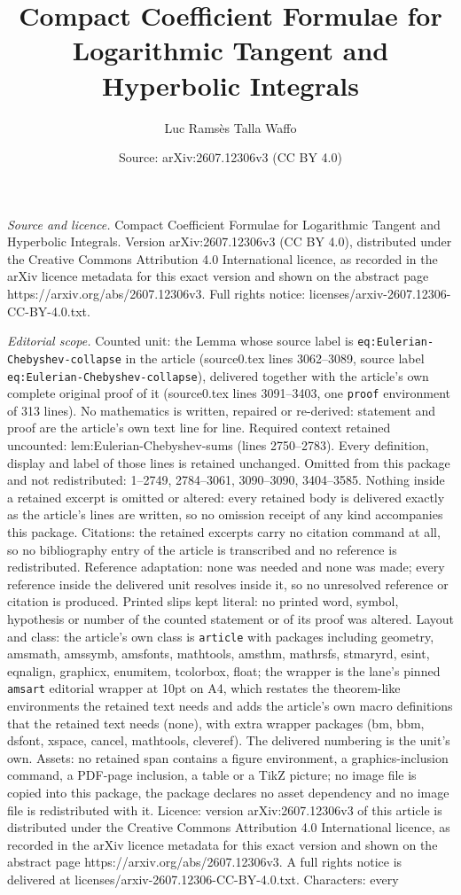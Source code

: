 \documentclass[10pt,a4paper]{amsart}
\title[Compact Coefficient Formulae for Logarithmic Tangent and Hyp]{Compact Coefficient Formulae for Logarithmic Tangent and Hyperbolic Integrals}
\author{Luc Rams\`es Talla Waffo}
\date{Source: arXiv:2607.12306v3 (CC BY 4.0)}
\begin{document}
\maketitle

\noindent\emph{Source and licence.} Compact Coefficient Formulae for Logarithmic Tangent and Hyperbolic Integrals. Version arXiv:2607.12306v3 (CC BY 4.0), distributed under the Creative Commons Attribution 4.0 International licence, as recorded in the arXiv licence metadata for this exact version and shown on the abstract page https://arxiv.org/abs/2607.12306v3. Full rights notice: licenses/arxiv-2607.12306-CC-BY-4.0.txt.\par\smallskip

\noindent\textit{Editorial scope.} Counted unit: the Lemma whose source label is \texttt{eq:Eulerian-Chebyshev-collapse} in the article (source0.tex lines 3062--3089, source label \texttt{eq:Eulerian-Chebyshev-collapse}), delivered together with the article's own complete original proof of it (source0.tex lines 3091--3403, one \texttt{proof} environment of 313 lines). No mathematics is written, repaired or re-derived: statement and proof are the article's own text line for line. Required context retained uncounted: lem:Eulerian-Chebyshev-sums (lines 2750--2783). Every definition, display and label of those lines is retained unchanged. Omitted from this package and not redistributed: 1--2749, 2784--3061, 3090--3090, 3404--3585. Nothing inside a retained excerpt is omitted or altered: every retained body is delivered exactly as the article's lines are written, so no omission receipt of any kind accompanies this package. Citations: the retained excerpts carry no citation command at all, so no bibliography entry of the article is transcribed and no reference is redistributed. Reference adaptation: none was needed and none was made; every reference inside the delivered unit resolves inside it, so no unresolved reference or citation is produced. Printed slips kept literal: no printed word, symbol, hypothesis or number of the counted statement or of its proof was altered. Layout and class: the article's own class is \texttt{article} with packages including geometry, amsmath, amssymb, amsfonts, mathtools, amsthm, mathrsfs, stmaryrd, esint, eqnalign, graphicx, enumitem, tcolorbox, float; the wrapper is the lane's pinned \texttt{amsart} editorial wrapper at 10pt on A4, which restates the theorem-like environments the retained text needs and adds the article's own macro definitions that the retained text needs (none), with extra wrapper packages (bm, bbm, dsfont, xspace, cancel, mathtools, cleveref). The delivered numbering is the unit's own. Assets: no retained span contains a figure environment, a graphics-inclusion command, a PDF-page inclusion, a table or a TikZ picture; no image file is copied into this package, the package declares no asset dependency and no image file is redistributed with it. Licence: version arXiv:2607.12306v3 of this article is distributed under the Creative Commons Attribution 4.0 International licence, as recorded in the arXiv licence metadata for this exact version and shown on the abstract page https://arxiv.org/abs/2607.12306v3. A full rights notice is delivered at licenses/arxiv-2607.12306-CC-BY-4.0.txt. Characters: every 
\end{document}
